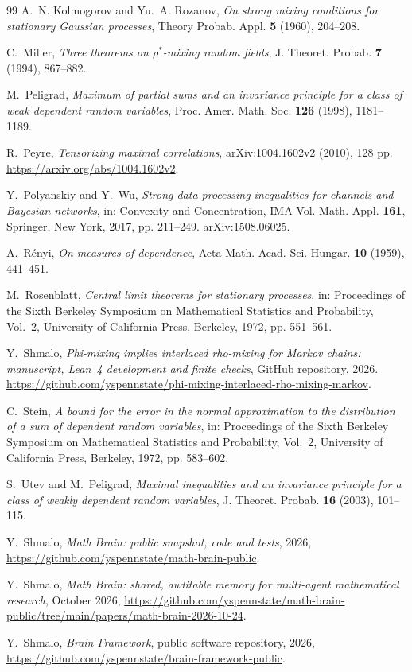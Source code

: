 \documentclass[11pt]{amsart}
\numberwithin{equation}{section}
\theoremstyle{definition}
\begin{document}
\begin{thebibliography}{99}
A.~N. Kolmogorov and Yu.~A. Rozanov, \emph{On strong mixing conditions for stationary Gaussian processes}, Theory Probab. Appl. \textbf{5} (1960), 204--208.

C.~Miller, \emph{Three theorems on $\rho^*$-mixing random fields}, J. Theoret. Probab. \textbf{7} (1994), 867--882.

M.~Peligrad, \emph{Maximum of partial sums and an invariance principle for a class of weak dependent random variables}, Proc. Amer. Math. Soc. \textbf{126} (1998), 1181--1189.

R.~Peyre, \emph{Tensorizing maximal correlations}, arXiv:1004.1602v2 (2010), 128 pp. \url{https://arxiv.org/abs/1004.1602v2}.

Y.~Polyanskiy and Y.~Wu, \emph{Strong data-processing inequalities for channels and Bayesian networks}, in: Convexity and Concentration, IMA Vol. Math. Appl. \textbf{161}, Springer, New York, 2017, pp. 211--249. arXiv:1508.06025.

A.~R\'enyi, \emph{On measures of dependence}, Acta Math. Acad. Sci. Hungar. \textbf{10} (1959), 441--451.

M.~Rosenblatt, \emph{Central limit theorems for stationary processes}, in: Proceedings of the Sixth Berkeley Symposium on Mathematical Statistics and Probability, Vol.~2, University of California Press, Berkeley, 1972, pp. 551--561.

Y.~Shmalo, \emph{Phi-mixing implies interlaced rho-mixing for Markov chains: manuscript, Lean~4 development and finite checks}, GitHub repository, 2026. \url{https://github.com/yspennstate/phi-mixing-interlaced-rho-mixing-markov}.

C.~Stein, \emph{A bound for the error in the normal approximation to the distribution of a sum of dependent random variables}, in: Proceedings of the Sixth Berkeley Symposium on Mathematical Statistics and Probability, Vol.~2, University of California Press, Berkeley, 1972, pp. 583--602.

S.~Utev and M.~Peligrad, \emph{Maximal inequalities and an invariance principle for a class of weakly dependent random variables}, J. Theoret. Probab. \textbf{16} (2003), 101--115.

 Y.~Shmalo, \emph{Math Brain: public snapshot, code and tests}, 2026, \url{https://github.com/yspennstate/math-brain-public}.

 Y.~Shmalo, \emph{Math Brain: shared, auditable memory for multi-agent mathematical research}, October 2026, \url{https://github.com/yspennstate/math-brain-public/tree/main/papers/math-brain-2026-10-24}.

 Y.~Shmalo, \emph{Brain Framework}, public software repository, 2026, \url{https://github.com/yspennstate/brain-framework-public}.

\end{thebibliography}
\end{document}

